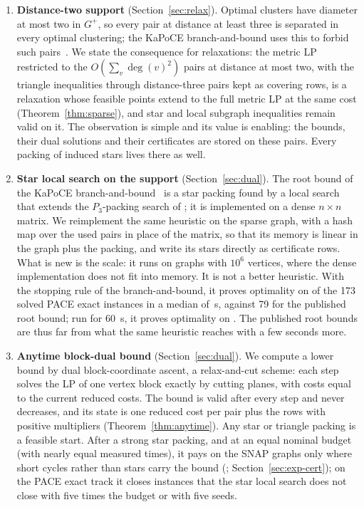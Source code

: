 \begin{enumerate}
\item \textbf{Distance-two support} (Section~\ref{sec:relax}).  Optimal
clusters have diameter at most two in $G^+$, so every pair at distance at
least three is separated in every optimal clustering; the KaPoCE
branch-and-bound uses this to forbid such pairs~\cite{BlasiusEtAl22sea}.  We
state the consequence for relaxations: the metric LP restricted to the
$O(\sum_v\deg(v)^2)$ pairs at distance at most two, with the triangle
inequalities through distance-three pairs kept as covering rows, is a
relaxation whose feasible points extend to the full metric LP at the same
cost (Theorem~\ref{thm:sparse}), and star and local subgraph inequalities
remain valid on it.  The observation is simple and its value is enabling:
the bounds, their dual solutions and their certificates are stored on these
pairs.  Every packing of induced stars lives there as well.

\item \textbf{Star local search on the support} (Section~\ref{sec:dual}).
The root bound of the KaPoCE branch-and-bound~\cite{BlasiusEtAl22sea} is a
star packing found by a local search that extends the $P_3$-packing search of
\citet{GottesburenHSSWZ20}; it is implemented on a dense $n\times n$ matrix.
We reimplement the same heuristic on the sparse graph, with a hash map over
the used pairs in place of the matrix, so that its memory is linear in the
graph plus the packing, and write its stars directly as certificate rows.
What is new is the scale: it runs on graphs with $10^6$ vertices, where the
dense implementation does not fit into memory.  It is not a better
heuristic.  With the stopping rule of the branch-and-bound, it proves
optimality on \numPaceKrOpt{} of the 173 solved PACE exact instances in a
median of \numPaceKrTimeMedian{}\,s, against 79 for the published root bound;
run for \SI{60}{s}, it proves optimality on \numPaceSlsOpt{}.  The published
root bounds are thus far from what the same heuristic reaches with a few
seconds more.

\item \textbf{Anytime block-dual bound} (Section~\ref{sec:dual}).  We compute
a lower bound by dual block-coordinate ascent, a relax-and-cut scheme: each
step solves the LP of one vertex block exactly by cutting planes, with costs
equal to the current reduced costs.  The bound is valid after every step and
never decreases, and its state is one reduced cost per pair plus the rows
with positive multipliers (Theorem~\ref{thm:anytime}).  Any star or triangle
packing is a feasible start.  After a strong star packing, and at an
equal nominal budget (with nearly equal measured times), it pays on the SNAP
graphs only where short cycles rather than
stars carry the bound (\numEqLpWinList{}; Section~\ref{sec:exp-cert}); on
the PACE exact track it closes \numPaceCfOnlyKept{} instances that the star
local search does not close with five times the budget or with five seeds.


\end{enumerate}
